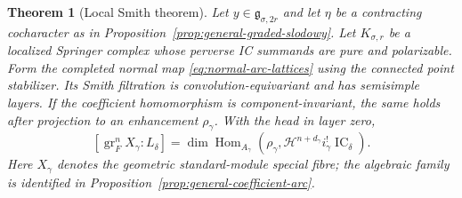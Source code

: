 \documentclass[11pt]{amsart}
\newtheorem{theorem}{Theorem}[section]
\theoremstyle{definition}
\theoremstyle{remark}
\newcommand{\IC}{\operatorname{IC}}
\begin{document}
\begin{theorem}[Local Smith theorem]
\label{thm:general-local}
Let $y\in\mathfrak g_{\sigma,2r}$ and let $\eta$ be a contracting
cocharacter as in Proposition~\ref{prop:general-graded-slodowy}.
Let $K_{\sigma,r}$ be a localized Springer complex whose perverse IC
summands are pure and polarizable.  Form the completed normal map
\eqref{eq:normal-arc-lattices} using the connected point stabilizer.
Its Smith filtration is convolution-equivariant and has semisimple
layers.  If the coefficient homomorphism is component-invariant, the same holds after
projection to an enhancement $\rho_\gamma$.  With the head in layer
zero,
\[
 [\operatorname{gr}_F^nX_\gamma:L_\delta]
 =\dim\operatorname{Hom}_{A_\gamma}\!\left(
 \rho_\gamma,\mathcal H^{n+d_\gamma}i_\gamma^!\IC_\delta\right).
\]
Here $X_\gamma$ denotes the geometric standard-module special fibre;
the algebraic family is identified in
Proposition~\ref{prop:general-coefficient-arc}.
\end{theorem}
\end{document}
